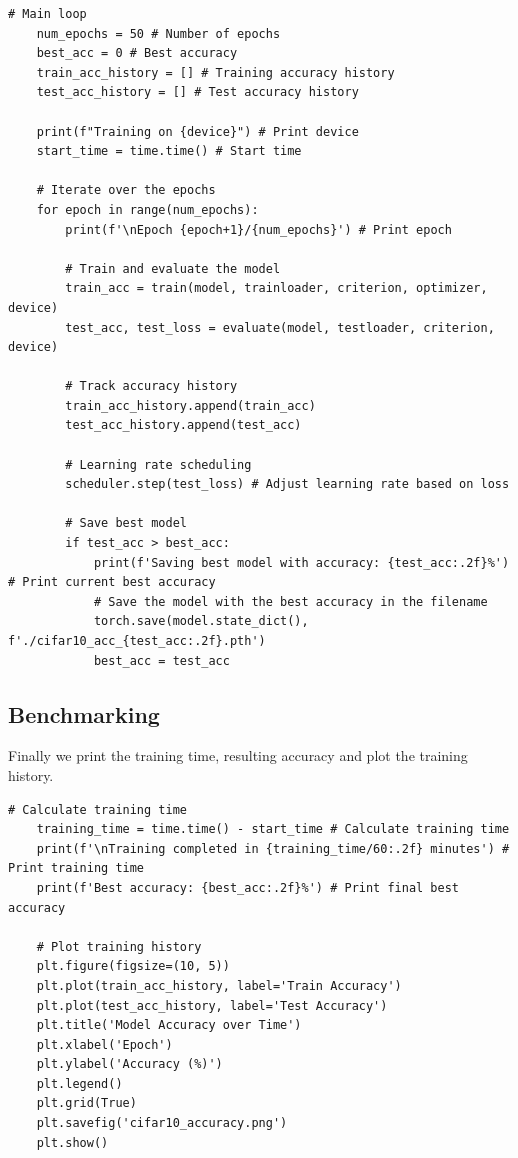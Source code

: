 \begin{lstlisting}[caption={Training Loop}, label={lst:training_loop}]
    # Main loop
    num_epochs = 50 # Number of epochs
    best_acc = 0 # Best accuracy
    train_acc_history = [] # Training accuracy history
    test_acc_history = [] # Test accuracy history

    print(f"Training on {device}") # Print device
    start_time = time.time() # Start time

    # Iterate over the epochs
    for epoch in range(num_epochs):
        print(f'\nEpoch {epoch+1}/{num_epochs}') # Print epoch
        
        # Train and evaluate the model
        train_acc = train(model, trainloader, criterion, optimizer, device)
        test_acc, test_loss = evaluate(model, testloader, criterion, device)
        
        # Track accuracy history
        train_acc_history.append(train_acc)
        test_acc_history.append(test_acc)
        
        # Learning rate scheduling
        scheduler.step(test_loss) # Adjust learning rate based on loss
        
        # Save best model
        if test_acc > best_acc:
            print(f'Saving best model with accuracy: {test_acc:.2f}%') # Print current best accuracy
            # Save the model with the best accuracy in the filename
            torch.save(model.state_dict(), f'./cifar10_acc_{test_acc:.2f}.pth')
            best_acc = test_acc
\end{lstlisting}

\subsection{Benchmarking}
Finally we print the training time, resulting accuracy and plot the training history.

\begin{lstlisting}[caption={Benchmark}, label={lst:benchmark}]
    # Calculate training time
    training_time = time.time() - start_time # Calculate training time
    print(f'\nTraining completed in {training_time/60:.2f} minutes') # Print training time
    print(f'Best accuracy: {best_acc:.2f}%') # Print final best accuracy

    # Plot training history
    plt.figure(figsize=(10, 5))
    plt.plot(train_acc_history, label='Train Accuracy')
    plt.plot(test_acc_history, label='Test Accuracy')
    plt.title('Model Accuracy over Time')
    plt.xlabel('Epoch')
    plt.ylabel('Accuracy (%)')
    plt.legend()
    plt.grid(True)
    plt.savefig('cifar10_accuracy.png')
    plt.show()
\end{lstlisting}

